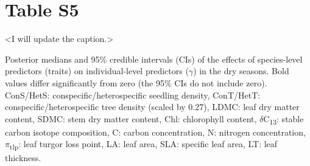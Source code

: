 \documentclass[
  12pt,
  letterpaper,
  DIV=11,
  numbers=noendperiod]{scrartcl}
\begin{document}
\newpage

\hypertarget{table-s5}{%
\section{Table S5}\label{table-s5}}

\textless I will update the caption.\textgreater{}

Posterior medians and 95\% credible intervals (CIs) of the effects of
species-level predictors (traits) on individual-level predictors
(\(\gamma\)) in the dry seasons. Bold values differ significantly from
zero (the 95\% CIs do not include zero). ConS/HetS:
conspecific/heterospecific seedling density, ConT/HetT:
conspecific/heterospecific tree density (scaled by 0.27), LDMC: leaf dry
matter content, SDMC: stem dry matter content, Chl: chlorophyll content,
\(\delta\)C\textsubscript{13}: stable carbon isotope composition, C:
carbon concentration, N: nitrogen concentration,
\(\pi\)\textsubscript{tlp}: leaf turgor loss point, LA: leaf area, SLA:
specific leaf area, LT: leaf thickness.
\end{document}
